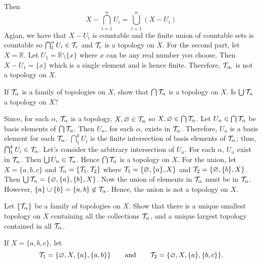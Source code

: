 \begin{exercise}
  Then
  \[
  X - \bigcap_{i = 1}^nU_i = \bigcup_{i = 1}^n(X - U_i)
  \]
  Agian, we have that \(X - U_i\) is countable and the finite union of
  countable sets is countable so \(\bigcap_1^nU_i\in\mathcal{T}_c\) and \(\mathcal{T}_c\) is
  a topology on \(X\).
  For the second part, let \(X = \mathbb{R}\).
  Let \(U_1 = \mathbb{R}\setminus\{x\}\) where \(x\) can be any real number you
  choose.
  Then \(X - U_1 = \{x\}\) which is a single element and is hence finite.
  Therefore, \(\mathcal{T}_{\infty}\) is not a topology on \(X\).
\item
  \begin{exercise}[label = (\alph*)]
  \item
    If \(\mathcal{T}_{\alpha}\) is a family of topologies on \(X\), show that
    \(\bigcap\mathcal{T}_{\alpha}\) is a topology on \(X\).
    Is \(\bigcup\mathcal{T}_{\alpha}\) a topology on \(X\)?
    \par\smallskip
    Since, for each \(\alpha\), \(\mathcal{T}_{\alpha}\) is a topology,
    \(X,\varnothing\in\mathcal{T}_{\alpha}\) so
    \(X,\varnothing\in\bigcap\mathcal{T}_{\alpha}\).
    Let \(U_n\in\bigcap\mathcal{T}_{\alpha}\) be basis elements of
    \(\bigcap\mathcal{T}_{\alpha}\).
    Then \(U_n\), for each \(\alpha\), exists in \(\mathcal{T}_{\alpha}\).
    Therefore, \(U_n\) is a basis element for each \(\mathcal{T}_{\alpha}\).
    \(\bigcap_1^kU_i\) is the finite intersection of basis elements of
    \(\mathcal{T}_{\alpha}\); thus, \(\bigcap_1^kU_i\in\mathcal{T}_{\alpha}\).
    Let's consider the arbitrary intersection of \(U_n\).
    For each \(\alpha\), \(U_n\) exist in \(\mathcal{T}_{\alpha}\).
    Then \(\bigcup U_n\in\mathcal{T}_{\alpha}\).
    Hence \(\bigcap\mathcal{T}_{\alpha}\) is a topology on \(X\).
    For the union, let \(X = \{a,b,c\}\) and
    \(\mathcal{T}_{\alpha} = \{\mathcal{T}_1,\mathcal{T}_2\}\) where
    \(\mathcal{T}_1 = \{\varnothing,\{a\},X\}\) and
    \(\mathcal{T}_2 = \{\varnothing,\{b\},X\}\).
    Then \(\bigcup\mathcal{T}_{\alpha} = \{\varnothing,\{a\},\{b\},X\}\).
    Now the union of elements in \(\mathcal{T}_{\alpha}\) must be in
    \(\mathcal{T}_{\alpha}\).
    However, \(\{a\}\cup\{b\} = \{a,b\}\not\in\mathcal{T}_{\alpha}\).
    Hence, the union is not a topology on \(X\).
  \item
    Let \(\{\mathcal{T}_{\alpha}\}\) be a family of topologies on \(X\).
    Show that there is a unique smallest topology on \(X\) containing all the
    collections \(\mathcal{T}_{\alpha}\), and a unique largest topology
    contained in all \(\mathcal{T}_{\alpha}\).
  \item
    If \(X = \{a,b,c\}\), let
    \[
    \mathcal{T}_1 = \{\varnothing, X, \{a\}, \{a, b\}\}\qquad\text{and}\qquad
    \mathcal{T}_2 = \{\varnothing, X, \{a\}, \{b, c\}\}.
\]
\end{exercise}
\end{exercise}
